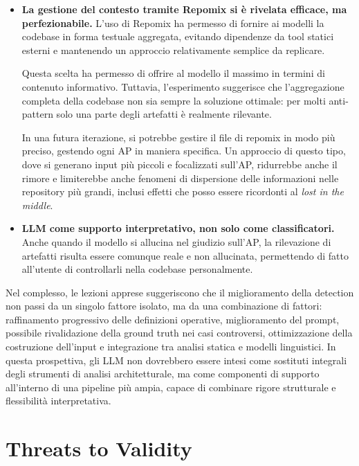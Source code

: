 \begin{itemize}
    \item \textbf{La gestione del contesto tramite Repomix si è rivelata efficace, ma perfezionabile.}  
    L’uso di Repomix ha permesso di fornire ai modelli la codebase in forma testuale aggregata, evitando dipendenze da tool statici esterni e mantenendo un approccio relativamente semplice da replicare. 
    
    Questa scelta ha permesso di offrire al modello il massimo in termini di contenuto informativo. Tuttavia, l’esperimento suggerisce che l’aggregazione completa della codebase non sia sempre la soluzione ottimale: per molti anti-pattern solo una parte degli artefatti è realmente rilevante. 
    
    In una futura iterazione, si potrebbe gestire il file di repomix in modo più preciso, gestendo ogni AP in maniera specifica. Un approccio di questo tipo, dove si generano input più piccoli e focalizzati sull'AP, ridurrebbe anche il rimore e limiterebbe anche fenomeni di dispersione delle informazioni nelle repository più grandi, inclusi effetti che posso essere ricordonti al \textit{lost in the middle}. 

    \item \textbf{LLM come supporto interpretativo, non solo come classificatori.}
    Anche quando il modello si allucina nel giudizio sull'AP, la rilevazione di artefatti risulta essere comunque reale e non allucinata, permettendo di fatto all'utente di controllarli nella codebase personalmente.
    
\end{itemize}

Nel complesso, le lezioni apprese suggeriscono che il miglioramento della detection non passi da un singolo fattore isolato, ma da una combinazione di fattori: raffinamento progressivo delle definizioni operative, miglioramento del prompt, possibile rivalidazione della ground truth nei casi controversi, ottimizzazione della costruzione dell’input e integrazione tra analisi statica e modelli linguistici. In questa prospettiva, gli LLM non dovrebbero essere intesi come sostituti integrali degli strumenti di analisi architetturale, ma come componenti di supporto all’interno di una pipeline più ampia, capace di combinare rigore strutturale e flessibilità interpretativa.

\section{Threats to Validity}

